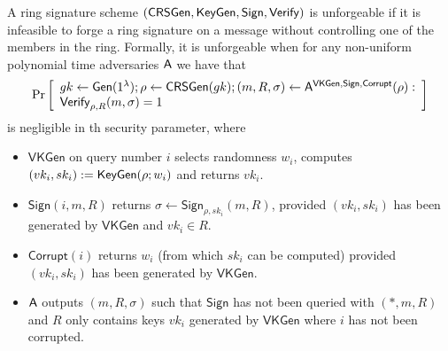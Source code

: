 \begin{definition}
A ring signature scheme $(\mathsf{CRSGen}, \mathsf{KeyGen}, \mathsf{Sign}, \mathsf{Verify})$
is unforgeable if it is infeasible to forge a ring
signature on a message without controlling one of the members in the ring. Formally, it
is unforgeable when for any non-uniform polynomial
time adversaries $\mathsf{A}$ we have that
$$
\Pr\left[\begin{array}{l}
gk\gets\mathsf{Gen}(1^\lambda);\rho\gets\mathsf{CRSGen}(gk);(m,R,\sigma)\gets\mathsf{A}^{\mathsf{VKGen},\mathsf{Sign},\mathsf{Corrupt}}(\rho):\\
\mathsf{Verify}_{\rho,R}(m,\sigma)=1
\end{array}\right]
$$
is negligible in th security parameter, where

\begin{itemize}
\item $\mathsf{VKGen}$ on query number $i$ selects randomness $w_i$, computes $(vk_i,sk_i):= \mathsf{KeyGen}(\rho; w_i)$
and returns $vk_i$.
\item $\mathsf{Sign}(i, m, R)$ returns $\sigma \gets \mathsf{Sign}_{\rho,sk_i}(m, R)$, provided $(vk_i, sk_i)$ has been generated
by $\mathsf{VKGen}$ and $vk_i\in R$.
\item $\mathsf{Corrupt}(i)$ returns $w_i$ (from which $sk_i$ can be computed) provided $(vk_i, sk_i)$ has
been generated by $\mathsf{VKGen}$.
\item $\mathsf{A}$ outputs $(m, R, \sigma)$ such that $\mathsf{Sign}$ has not been queried with $(*, m, R)$ and $R$
only contains keys $vk_i$ generated by $\mathsf{VKGen}$ where $i$ has not been corrupted.
\end{itemize}
\end{definition}


